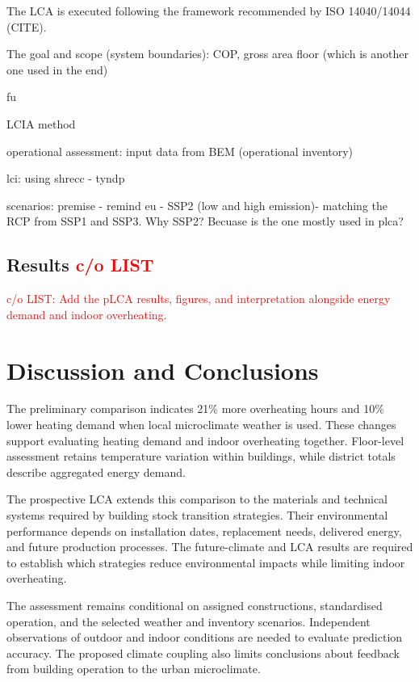 \documentclass[runningheads]{llncs}
\newcommand{\TODO}[1]{\textcolor{red}{#1}}
\begin{document}
The LCA is executed following the framework recommended by ISO 14040/14044 (CITE). 

The goal and scope (system boundaries): COP, gross area floor (which is another one used in the end)

fu

LCIA method


operational assessment: input data from BEM (operational inventory)

lci: using shrecc - tyndp

scenarios: premise - remind eu - SSP2 (low and high emission)- matching the RCP from SSP1 and SSP3. 
Why SSP2? Becuase is the one mostly used in plca? 


 

\subsection{Results \TODO{c/o LIST}}

\TODO{c/o LIST: Add the pLCA results, figures, and interpretation alongside energy demand and indoor overheating.}

\section{Discussion and Conclusions}

The preliminary comparison indicates 21\% more overheating hours and 10\% lower heating demand when local microclimate weather is used. These changes support evaluating heating demand and indoor overheating together. Floor-level assessment retains temperature variation within buildings, while district totals describe aggregated energy demand.

The prospective LCA extends this comparison to the materials and technical systems required by building stock transition strategies. Their environmental performance depends on installation dates, replacement needs, delivered energy, and future production processes. The future-climate and LCA results are required to establish which strategies reduce environmental impacts while limiting indoor overheating.

The assessment remains conditional on assigned constructions, standardised operation, and the selected weather and inventory scenarios. Independent observations of outdoor and indoor conditions are needed to evaluate prediction accuracy. The proposed climate coupling also limits conclusions about feedback from building operation to the urban microclimate.
\end{document}
